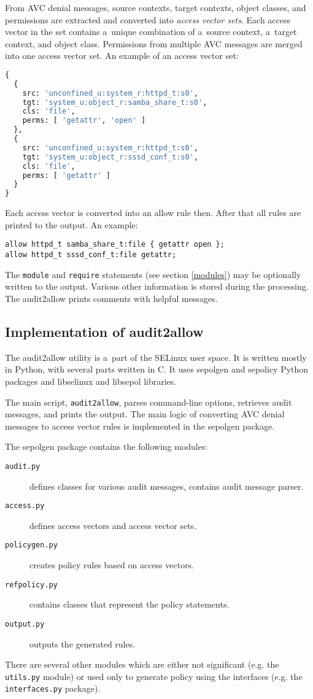 From AVC denial messages, source contexts, target contexts, object classes, and
permissions are extracted and converted into \emph{access vector sets}. Each
access vector in the set contains a~unique combination of a~source context,
a~target context, and object class. Permissions from multiple AVC messages are
merged into one access vector set. An example of an access vector set:
\begin{lstlisting}[language=Python]
{
  {
    src: 'unconfined_u:system_r:httpd_t:s0',
    tgt: 'system_u:object_r:samba_share_t:s0',
    cls: 'file',
    perms: [ 'getattr', 'open' ]
  },
  {
    src: 'unconfined_u:system_r:httpd_t:s0',
    tgt: 'system_u:object_r:sssd_conf_t:s0',
    cls: 'file',
    perms: [ 'getattr' ]
  }
}
\end{lstlisting}

Each access vector is converted into an allow rule then. After that all rules
are printed to the output. An example:
\begin{lstlisting}
allow httpd_t samba_share_t:file { getattr open };
allow httpd_t sssd_conf_t:file getattr;
\end{lstlisting}

The \texttt{module} and \texttt{require} statements (see section \ref{modules})
may be optionally written to the output. Various other information is stored
during the processing. The audit2allow prints comments with helpful messages.

\subsection{Implementation of audit2allow}
\label{implementation}
The audit2allow utility is a~part of the SELinux user space. It is written mostly
in Python, with several parts written in C. It uses sepolgen and sepolicy Python
packages and libselinux and libsepol libraries.

The main script, \texttt{audit2allow}, parses command-line options, retrieves
audit messages, and prints the output. The main logic of converting AVC denial
messages to access vector rules is implemented in the sepolgen package.

The sepolgen package contains the following modules:
\begin{description}
    \item [\texttt{audit.py}] defines classes for various audit messages,
        contains audit message parser.
    \item [\texttt{access.py}] defines access vectors and access vector sets.
    \item [\texttt{policygen.py}] creates policy rules based on access vectors.
    \item [\texttt{refpolicy.py}] contains classes that represent the policy
        statements.
    \item [\texttt{output.py}] outputs the generated rules.
\end{description}
There are several other modules which are either not significant (e.g. the
\texttt{utils.py} module) or used only to generate policy using the interfaces
(e.g. the \texttt{interfaces.py} package).

